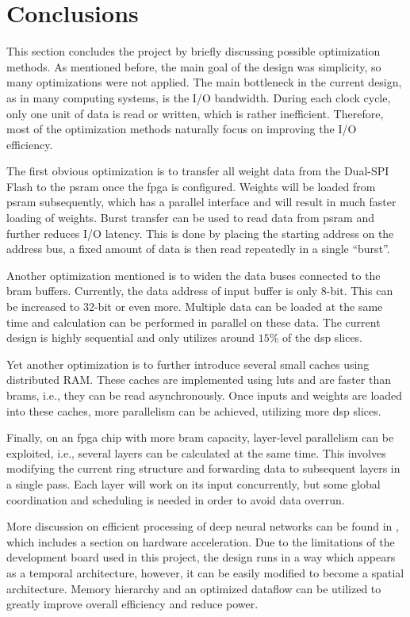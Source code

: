 
\chapter{Conclusions}

This section concludes the project by briefly discussing possible optimization methods.
As mentioned before, the main goal of the design was simplicity, so many optimizations were not applied.
The main bottleneck in the current design, as in many computing systems, is the I/O bandwidth. During
each clock cycle, only one unit of data is read or written, which is rather inefficient. Therefore, most of the
optimization methods naturally focus on improving the I/O efficiency.

The first obvious optimization is to transfer all weight data from the Dual-SPI Flash to the \gls{psram} once
the \gls{fpga} is configured. Weights will be loaded from \gls{psram} subsequently, which has a parallel
interface and will result in much faster loading of weights.
Burst transfer can be used to read data from \gls{psram} and further reduces I/O latency. This is done by
placing the starting address on the address bus, a fixed amount of data is then read repeatedly in a single
``burst''.

Another optimization mentioned is to widen the data buses connected to the \gls{bram} buffers. Currently, the
data address of input buffer is only 8-bit. This can be increased to 32-bit or even more. Multiple data
can be loaded at the same time and calculation can be performed in parallel on these data. The current
design is highly sequential and only utilizes around $15\%$ of the \gls{dsp} slices.

Yet another optimization is to further introduce several small caches using distributed RAM. These caches
are implemented using \glspl{lut} and are faster than \glspl{bram}, i.e., they can be read asynchronously.
Once inputs and weights are loaded into these caches, more parallelism can be achieved, utilizing more \gls{dsp} slices.

Finally, on an \gls{fpga} chip with more \gls{bram} capacity, layer-level parallelism can be exploited, i.e.,
several layers can be calculated at the same time. This involves modifying the current ring structure and
forwarding data to subsequent layers in a single pass. Each layer will work on its input concurrently, but
some global coordination and scheduling is needed in order to avoid data overrun.

More discussion on efficient processing of deep neural networks can be found in
\cite{DBLP:journals/corr/SzeCYE17}, which includes a section on hardware acceleration.
Due to the limitations of the development board used in this project, the design runs in a way which appears as a temporal architecture, however, it can be easily modified to become a spatial architecture.
Memory hierarchy and an optimized dataflow can be utilized to greatly improve overall efficiency and reduce
power.

\clearpage %
